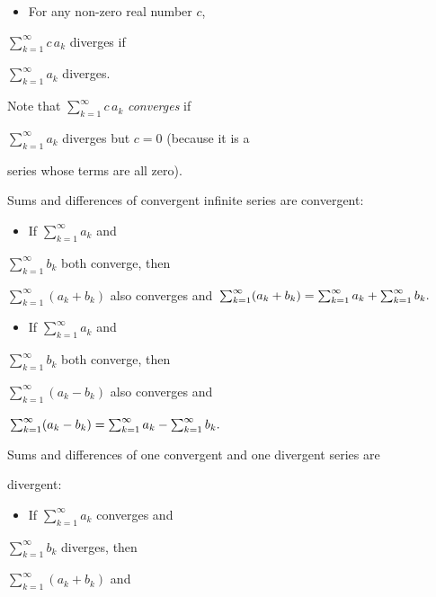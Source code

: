 \begin{itemize}
    \item For any non-zero real number $c$,
\end{itemize}
    $\textstyle \sum _{k=1}^{\infty} c\,a_k$ diverges if

    $\textstyle \sum _{k=1}^{\infty} a_k$ diverges.


Note that $\textstyle \sum _{k=1}^{\infty} c\,a_k$ \textit{converges} if

$\textstyle \sum _{k=1}^{\infty} a_k$ diverges but $c=0$ (because it is a

series whose terms are all zero).


Sums and differences of convergent infinite series are convergent:


\begin{itemize}
    \item If $\textstyle \sum _{k=1}^{\infty} a_k$ and
\end{itemize}
    $\textstyle \sum _{k=1}^{\infty} b_k$ both converge, then

    $\textstyle \sum _{k=1}^{\infty} (a_k+b_k)$ also converges and $\newline \textstyle \sum _{k=1}^{\infty} (a_k+b_k) = \sum _{k=1}^{\infty} a_k + \sum _{k=1}^{\infty} b_k.\newline$

\begin{itemize}
    \item If $\textstyle \sum _{k=1}^{\infty} a_k$ and
\end{itemize}
    $\textstyle \sum _{k=1}^{\infty} b_k$ both converge, then

    $\textstyle \sum _{k=1}^{\infty} (a_k-b_k)$ also converges and

    $\newline \textstyle \sum _{k=1}^{\infty} (a_k-b_k) = \sum _{k=1}^{\infty} a_k - \sum _{k=1}^{\infty} b_k. \newline$


Sums and differences of one convergent and one divergent series are

divergent:


\begin{itemize}
    \item If $\textstyle \sum _{k=1}^{\infty} a_k$ converges and
\end{itemize}
    $\textstyle \sum _{k=1}^{\infty} b_k$ diverges, then

    $\textstyle \sum _{k=1}^{\infty} (a_k+b_k)$ and

